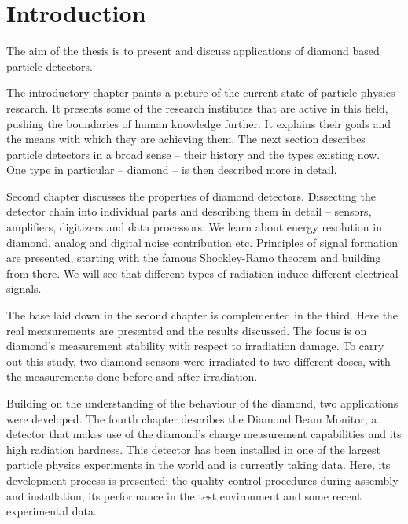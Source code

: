 \documentclass[twoside,12pt]{packages/mytustyle}  %
\begin{document}
\baselineskip=15pt



\chapter{Introduction}


The aim of the thesis is to present and discuss applications of diamond based particle detectors. 

The introductory chapter paints a picture of the current state of particle physics research. It presents some of the research institutes that are active in this field, pushing the boundaries of human knowledge further. It explains their goals and the means with which they are achieving them. The next section describes particle detectors in a broad sense -- their history and the types existing now. One type in particular -- diamond -- is then described more in detail.

Second chapter discusses the properties of diamond detectors. Dissecting the detector chain into individual parts and describing them in detail -- sensors, amplifiers, digitizers and data processors. We learn about energy resolution in diamond, analog and digital noise contribution etc. Principles of signal formation are presented, starting with the famous Shockley-Ramo theorem and building from there. We will see that different types of radiation induce different electrical signals.

The base laid down in the second chapter is complemented in the third. Here the real measurements are presented and the results discussed. The focus is on diamond's measurement stability with respect to irradiation damage. To carry out this study, two diamond sensors were irradiated to two different doses, with the measurements done before and after irradiation.

Building on the understanding of the behaviour of the diamond, two applications were developed. The fourth chapter describes the Diamond Beam Monitor, a detector that makes use of the diamond's charge measurement capabilities and its high radiation hardness. This detector has been installed in one of the largest particle physics experiments in the world and is currently taking data. Here, its development process is presented: the quality control procedures during assembly and installation, its performance in the test environment and some recent experimental data.
\end{document}
